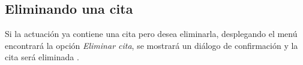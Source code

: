 \subsection{Eliminando una cita}
\label{sec:eliminarCita}
Si la actuaci\'on ya contiene una cita pero desea eliminarla, desplegando el
men\'u \blackberry encontrar\'a la opci\'on \emph{Eliminar cita}, se mostrar\'a
un di\'alogo de confirmaci\'on y la cita ser\'a eliminada
\footnotemark[\value{footnote}].